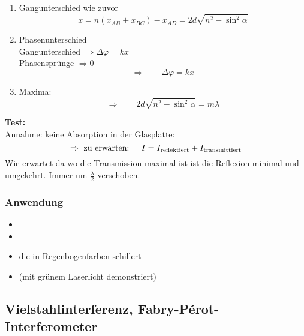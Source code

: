 \begin{enumerate}[(1)]
	\item Gangunterschied wie zuvor
	\begin{equation*}
	x = n (x_{AB} + x_{BC}) - x_{AD} = 2 d \sqrt{n^2 - \sin^2 \alpha}
	\end{equation*}
	\item Phasenunterschied\\
	Gangunterschied $ \Rightarrow \Delta \varphi = kx $\\
	Phasensprünge $ \Rightarrow 0 $
	\begin{equation*}
	\Rightarrow \qquad \Delta \varphi = kx
	\end{equation*}
	\item Maxima:
	\begin{equation*}
	\Rightarrow \qquad 2d\sqrt{n^2 - \sin^2 \alpha} = m \lambda
	\end{equation*}
\end{enumerate}
\textbf{Test:}\\
Annahme: keine Absorption in der Glasplatte: 
\begin{equation*}
\Rightarrow \textrm{ zu erwarten: } \quad I = I_{\textrm{reflektiert}} + I_{\textrm{transmittiert}}
\end{equation*}
Wie erwartet da wo die Transmission maximal ist ist die Reflexion minimal und umgekehrt. Immer um $ \frac{\lambda}{2} $ verschoben.
\subsubsection{Anwendung}
\begin{itemize}
	\item {}
	\item {}
	\item {} die in Regenbogenfarben schillert
	\item {} (mit grünem Laserlicht demonstriert)
\end{itemize}

\subsection{Vielstahlinterferenz, Fabry-P\'erot-Interferometer}

